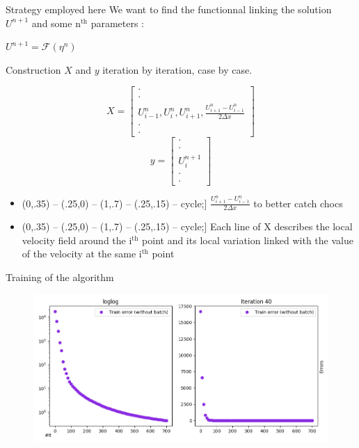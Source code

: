 \documentclass[10pt,
			   xcolor=svgnames,
			   hyperref={linkcolor=red, citecolor = DarkGreen, colorlinks=true, urlcolor=Navy}]{beamer}
\def\checkmark{\tikz\fill[scale=0.4](0,.35) -- (.25,0) -- (1,.7) -- (.25,.15) -- cycle;}
\newcommand{\bepar}[1]{
	\left( #1 \right)  
}
\begin{document}
\begin{frame}{Strategy employed here}
	We want to find the functionnal linking the solution $U^{n+1}$ and some n$^{\text{th}}$ parameters :\\
	\begin{center}
	$ \displaystyle U^{n+1} = \mathcal{F}\bepar{\eta^n}$ \\
	\end{center}
	Construction $X$ and $y$ iteration by iteration, case by case.\\

	\begin{multicols}{2}
	\noindent
	$$ X = \left[ \begin{array}{c} \cdot \\ \cdot \\ U^n_{i-1},U^n_{i}, U^n_{i+1}, \frac{U^n_{i+1} - U^n_{i-1}}{2\Delta x}  \\ \cdot \\ \cdot
				  \end{array}
		   \right]
	$$
	\columnbreak
	$$ y = \left[ \begin{array}{c} \cdot \\ \cdot \\ U^{n+1}_i \\ \cdot \\ \cdot
			  \end{array}
	   \right]
	$$
	\end{multicols}
	
	\begin{itemize}
		\item[\checkmark] $\displaystyle \frac{U^n_{i+1} - U^n_{i-1}}{2\Delta x}$ to better catch chocs \\
		\item[\checkmark] Each line of X describes the local velocity field around the i$^{\text{th}}$ point and its local variation linked with the value of the velocity at the same i$^{\text{th}}$ point
	\end{itemize}		
	
\end{frame}

\begin{frame}{Training of the algorithm}
	\begin{figure}[H]
		\centering
		\includegraphics[scale=0.45]{Cost_Evolution_:_loglog_and_lin.png}
	\end{figure}
\end{frame}
\end{document}
